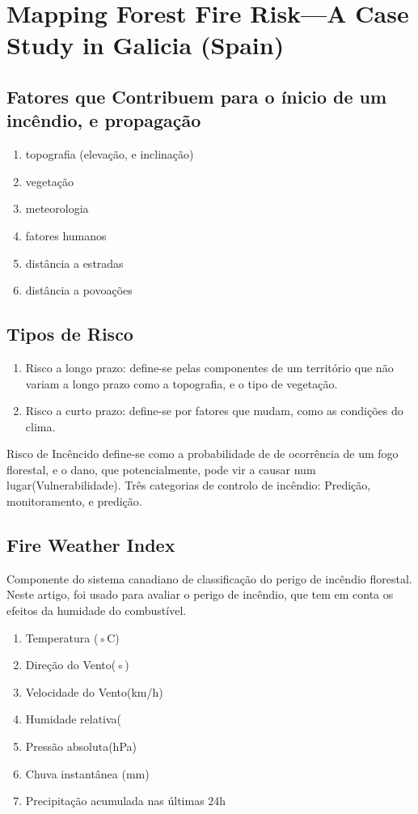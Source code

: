 \documentclass{article}
\begin{document}
\section{Mapping Forest Fire Risk—A Case Study in
Galicia (Spain) \cite{Novo2020MappingFF}}

\subsection{Fatores que Contribuem para o ínicio de um incêndio, e propagação}
\begin{enumerate}
\item topografia (elevação, e inclinação)
\item vegetação
\item meteorologia
\item fatores humanos
\item distância a estradas
\item distância a povoações
\end{enumerate}

\subsection{Tipos de Risco}
\begin{enumerate}
\item Risco a longo prazo: define-se pelas componentes de um território que não variam a longo prazo como a topografia, e o tipo de vegetação.
\item Risco a curto prazo: define-se por fatores que mudam, como as condições do clima.
\end{enumerate}
Risco de Incêncido define-se como a probabilidade de de ocorrência de um fogo florestal, e o dano, que potencialmente, pode vir a causar num lugar(Vulnerabilidade).
Três categorias de controlo de incêndio: Predição, monitoramento, e predição.

\subsection{Fire Weather Index} 
Componente do sistema canadiano de classificação do perigo de incêndio florestal. Neste artigo, foi usado para avaliar o perigo de incêndio, que tem em conta os efeitos da humidade do combustível.

\begin{enumerate}
    \item Temperatura (◦C)
    \item Direção do Vento(◦)
    \item Velocidade do Vento(km/h)
    \item Humidade relativa(%
    \item Pressão absoluta(hPa)
    \item Chuva instantânea (mm)
    \item Precipitação acumulada nas últimas 24h
\end{enumerate}
\end{document}
